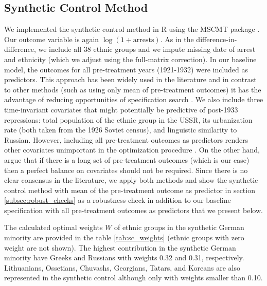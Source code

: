 \subsection{Synthetic Control Method}
We implemented the synthetic control method in R  using the MSCMT package \citep{becker_fast_2018}.
Our outcome variable is again $\log\left(1 + \text{arrests}\right)$.
As in the difference-in-difference, we include all 38 ethnic groups and we impute missing date of arrest and ethnicity (which we adjust using the full-matrix correction).
In our baseline model, the  outcomes for all pre-treatment years (1921-1932)  were included  as predictors. 
This approach has been widely used in the literature \citep{billmeier_assessing_2013, cavallo_catastrophic_2013, bohn_did_2014} and in contrast to other methods (such as using only mean of pre-treatment outcomes) it  has the advantage  of reducing opportunities of specification search  \citep{ferman_cherry_2018}. 
We also include three time-invariant covariates that might potentially be predictive of post-1933 repressions: total population of the ethnic group in the USSR, its urbanization rate (both taken from the 1926 Soviet census), and linguistic similarity to Russian. 
However, including all pre-treatment outcomes as predictors  renders  other  covariates unimportant in the optimization procedure \citep{kaul_synthetic_2018}. On the other hand, \citet{botosaru_role_2019} argue that if there is a long set of pre-treatment outcomes (which is our case) then a perfect balance on covariates should not be required.
Since there is no clear consensus in the literature, we apply both methods and show the synthetic control method with mean of the pre-treatment outcome as predictor in section \ref{subsec:robust_checks} as a robustness check in addition to our baseline specification with  all pre-treatment outcomes as predictors that we present below. 



The calculated optimal weights $W$ of ethnic groups in the synthetic German minority are provided in the table \ref{tab:sc_weights} (ethnic groups with zero weight are not shown). The highest contribution in the synthetic German minority have Greeks and Russians  with weights 0.32 and 0.31, respectively.  Lithuanians, Ossetians, Chuvashs, Georgians, Tatars, and Koreans  are also represented in the synthetic control although only with  weights smaller than 0.10. 


